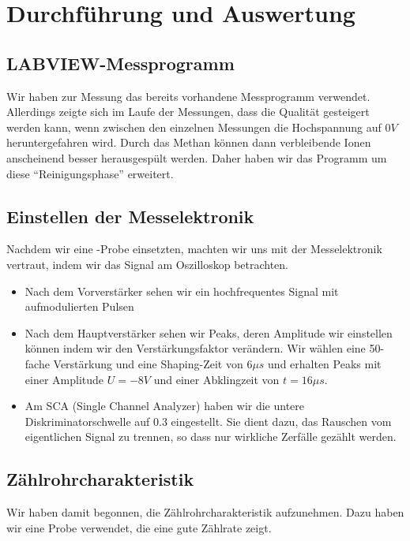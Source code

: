 \section{Durchführung und Auswertung}

\subsection{LABVIEW-Messprogramm}

Wir haben zur Messung das bereits vorhandene Messprogramm verwendet. Allerdings zeigte sich im Laufe der Messungen, dass die Qualität gesteigert werden kann, wenn zwischen den einzelnen Messungen die Hochspannung auf $0V$ heruntergefahren wird. Durch das Methan können dann verbleibende Ionen anscheinend besser herausgespült werden. Daher haben wir das Programm um diese "`Reinigungsphase"' erweitert.

\subsection{Einstellen der Messelektronik}
Nachdem wir eine -Probe einsetzten, machten wir uns mit der Messelektronik vertraut, indem wir das Signal am Oszilloskop betrachten.
\begin{itemize}
 \item Nach dem Vorverstärker sehen wir ein hochfrequentes Signal mit aufmodulierten Pulsen
 \item Nach dem Hauptverstärker sehen wir Peaks, deren Amplitude wir einstellen können indem wir den Verstärkungsfaktor verändern. Wir wählen eine 50-fache Verstärkung und eine Shaping-Zeit von $6\mu s$ und erhalten Peaks mit einer Amplitude $U = -8V$ und einer Abklingzeit von $t = 16\mu s$.
 \item Am SCA (Single Channel Analyzer) haben wir die untere Diskriminatorschwelle auf $0.3$ eingestellt. Sie dient dazu, das Rauschen vom eigentlichen Signal zu trennen, so dass nur wirkliche Zerfälle gezählt werden. 
\end{itemize}


\subsection{Zählrohrcharakteristik}

Wir haben damit begonnen, die Zählrohrcharakteristik aufzunehmen. Dazu haben wir eine  Probe verwendet, die eine gute Zählrate zeigt.

